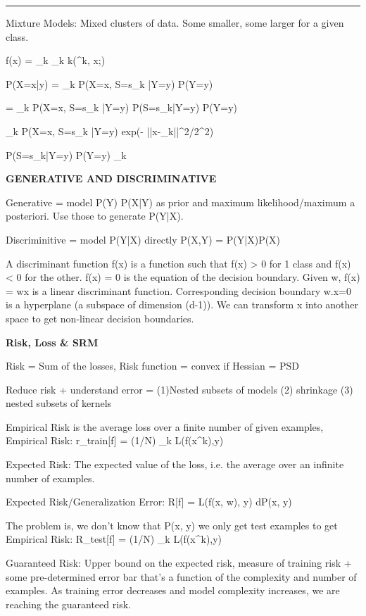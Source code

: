 \documentclass[a4paper,twoside,twocolumn]{article}
\begin{document}
{{\noindent\rule{8cm}{0.4pt}

Mixture Models: Mixed clusters of data. Some smaller, some larger for a given class.

f(x) = \sum_k \alpha_k k(\mu^k, x;\sigma)

P(X=x|y) = \Sigma_k P(X=x, S=s_k |Y=y) P(Y=y)

= \Sigma_k P(X=x, S=s_k |Y=y) P(S=s_k|Y=y) P(Y=y)

\Sigma_k P(X=x, S=s_k |Y=y) \propto exp(- ||x-\mu_k||^2/2\sigma^2)

P(S=s_k|Y=y) P(Y=y) \propto \alpha_k

}

\textbf{GENERATIVE AND DISCRIMINATIVE}

\setlength{\parindent}{0pt}
{\scriptsize

Generative = model P(Y) P(X|Y) as prior and maximum likelihood/maximum a posteriori. Use those to generate P(Y|X).

Discriminitive = model P(Y|X) directly \rightarrow P(X,Y) = P(Y|X)P(X)

A discriminant function f(x) is a function such that f(x) > 0 for 1 class and f(x) < 0 for the other. f(x) = 0 is the equation of the decision boundary. Given w, f(x) = wx is a linear discriminant function. Corresponding decision boundary w.x=0 is a hyperplane (a subspace of dimension (d-1)). We can transform x into another space to get non-linear decision boundaries.
}

\textbf{Risk, Loss \& SRM}
\setlength{\parindent}{0pt}
{\scriptsize

Risk = Sum of the losses, Risk function = convex if Hessian = PSD

Reduce risk + understand error = (1)Nested subsets of models (2) shrinkage (3) nested subsets of kernels

Empirical Risk is the average loss over a finite number of given examples, Empirical Risk: r_{train}[f] = (1/N) \Sigma_k L(f(x^k),y)

Expected Risk: The expected value of the loss, i.e. the average over an infinite number of examples.

Expected Risk/Generalization Error: R[f] = \int L(f(x, w), y) dP(x, y)

The problem is, we don't know that P(x, y) we only get test examples to get Empirical Risk: R_{test}[f] = (1/N) \Sigma_k L(f(x^k),y)

Guaranteed Risk: Upper bound on the expected risk, measure of training risk + some pre-determined error bar that's a function of the complexity and number of examples. As training error decreases and model complexity increases, we are reaching the guaranteed risk.

}}
\end{document}
